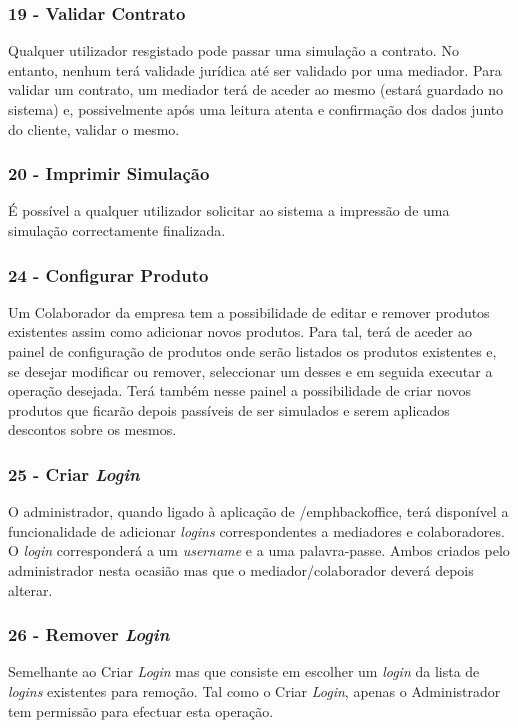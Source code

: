 \subsubsection{\textbf{19 - Validar Contrato}}
Qualquer utilizador resgistado pode passar uma simulação a contrato. No entanto, nenhum terá validade jurídica até ser validado por uma mediador. Para validar um contrato, um mediador terá de aceder ao mesmo (estará guardado no sistema) e, possivelmente após uma leitura atenta e confirmação dos dados junto do cliente, validar o mesmo.

\subsubsection{\textbf{20 - Imprimir Simulação}}
É possível a qualquer utilizador solicitar ao sistema a impressão de uma simulação correctamente finalizada.

\subsubsection{\textbf{24 - Configurar Produto}}
Um Colaborador da empresa tem a possibilidade de editar e remover produtos existentes assim como adicionar novos produtos. Para tal, terá de aceder ao painel de configuração de produtos onde serão listados os produtos existentes e, se desejar modificar ou remover, seleccionar um desses e em seguida executar a operação desejada. Terá também nesse painel a possibilidade de criar novos produtos que ficarão depois passíveis de ser simulados e serem aplicados descontos sobre os mesmos.

\subsubsection{\textbf{25 - Criar \emph{Login}}}
O administrador, quando ligado à aplicação de /emph{backoffice}, terá disponível a funcionalidade de adicionar \emph{logins} correspondentes a mediadores e colaboradores. O \emph{login} corresponderá a um \emph{username} e a uma palavra-passe. Ambos criados pelo administrador nesta ocasião mas que o mediador/colaborador deverá depois alterar.

\subsubsection{\textbf{26 - Remover \emph{Login}}}
Semelhante ao Criar \emph{Login} mas que consiste em escolher um \emph{login} da lista de \emph{logins} existentes para remoção. Tal como o Criar \emph{Login}, apenas o Administrador tem permissão para efectuar esta operação.
